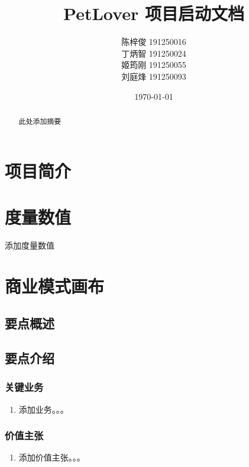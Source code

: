 \documentclass[a4paper]{ctexart}
\title{\Huge PetLover 项目启动文档}
\author{
  陈梓俊 191250016\\
  丁炳智 191250024\\
  姬筠刚 191250055\\
  刘庭烽 191250093\\
}
\date{\today}
\begin{document}
\maketitle

\begin{abstract}
  此处添加摘要
\end{abstract}



\tableofcontents

\newpage

\setlength{\parskip}{1em}


\section{项目简介}



\section{度量数值}

添加度量数值

\section{商业模式画布}

\subsection{要点概述}

\subsection{要点介绍}

\subsubsection{关键业务}

\begin{enumerate}[label=\alph*.]
  \item 添加业务。。。
\end{enumerate}

\subsubsection{价值主张}

\begin{enumerate}[label=\alph*.]
  \item 添加价值主张。。。
\end{enumerate}
\end{document}

